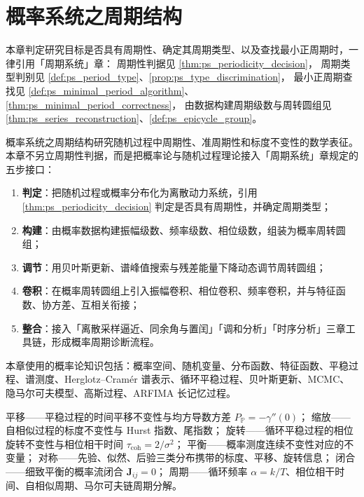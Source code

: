 \chapter{概率系统之周期结构}
\label{chap:prob_periodic}
\label{chap:probability-periodic}

\begin{remark}[本章目标的周期性判定（引用）]\label{rem:prob_ps_hook}
本章判定研究目标是否具有周期性、确定其周期类型、以及查找最小正周期时，一律引用「周期系统」章：
周期性判据见 \cref{thm:ps_periodicity_decision}，
周期类型判别见 \cref{def:ps_period_type}、\cref{prop:ps_type_discrimination}，
最小正周期查找见 \cref{def:ps_minimal_period_algorithm}、\cref{thm:ps_minimal_period_correctness}，
由数据构建周期级数与周转圆组见 \cref{thm:ps_series_reconstruction}、\cref{def:ps_epicycle_group}。
\end{remark}

\begin{remark}\label{rem:prob_chapter_positioning}
概率系统之周期结构研究随机过程中周期性、准周期性和标度不变性的数学表征。本章不另立周期性判据，而是把概率论与随机过程理论接入「周期系统」章规定的五步接口：
\begin{enumerate}[label=(\arabic*)]
    \item \textbf{判定}：把随机过程或概率分布化为离散动力系统，引用 \cref{thm:ps_periodicity_decision} 判定是否具有周期性，并确定周期类型；
    \item \textbf{构建}：由概率数据构建振幅级数、频率级数、相位级数，组装为概率周转圆组；
    \item \textbf{调节}：用贝叶斯更新、谱峰值搜索与残差能量下降动态调节周转圆组；
    \item \textbf{卷积}：在概率周转圆组上引入振幅卷积、相位卷积、频率卷积，并与特征函数、协方差、互相关衔接；
    \item \textbf{整合}：接入「离散采样逼近、同余角与置闰」「调和分析」「时序分析」三章工具链，形成概率周期诊断流程。
\end{enumerate}
本章使用的概率论知识包括：概率空间、随机变量、分布函数、特征函数、平稳过程、谱测度、Herglotz--Cramér 谱表示、循环平稳过程、贝叶斯更新、MCMC、隐马尔可夫模型、高斯过程、ARFIMA 长记忆过程。
\end{remark}

\begin{remark}[本章七主题导引]\label{rem:prob_seven_themes}
平移——平稳过程的时间平移不变性与均方导数方差 $P_{\mathbb P}=-\gamma''(0)$；
缩放——自相似过程的标度不变性与 Hurst 指数、尾指数；
旋转——循环平稳过程的相位旋转不变性与相位相干时间 $\tau_{\mathrm{coh}}=2/\sigma^2$；
平衡——概率测度连续不变性对应的不变量；
对称——先验、似然、后验三类分布携带的标度、平移、旋转信息；
闭合——细致平衡的概率流闭合 $\mathbf J_{ij}=0$；
周期——循环频率 $\alpha=k/T$、相位相干时间、自相似周期、马尔可夫链周期分解。
\end{remark}


